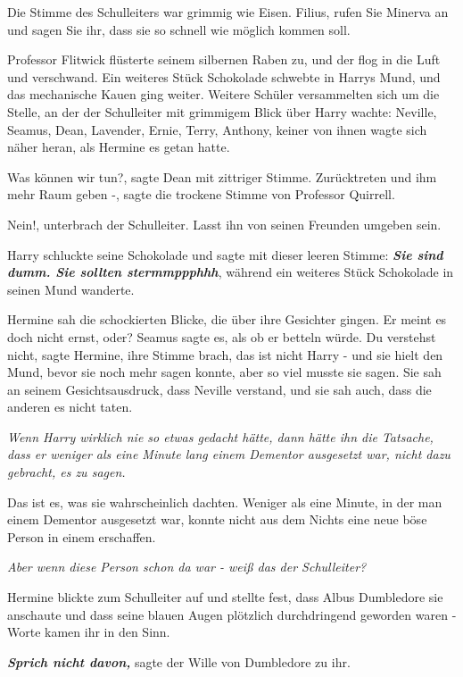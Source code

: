 Die Stimme des Schulleiters war grimmig wie Eisen. \glqq{}Filius, rufen Sie
Minerva an und sagen Sie ihr, dass sie so schnell wie möglich kommen soll.\grqq{}

Professor Flitwick flüsterte seinem silbernen Raben zu, und der flog in die Luft
und verschwand. Ein weiteres Stück Schokolade schwebte in Harrys Mund, und das
mechanische Kauen ging weiter. Weitere Schüler versammelten sich um die Stelle,
an der der Schulleiter mit grimmigem Blick über Harry wachte: Neville, Seamus,
Dean, Lavender, Ernie, Terry, Anthony, keiner von ihnen wagte sich näher heran,
als Hermine es getan hatte.

\glqq{}Was können wir tun?\grqq{}, sagte Dean mit zittriger Stimme. \glqq{}
Zurücktreten und ihm mehr Raum geben -\grqq{}, sagte die trockene Stimme von
Professor Quirrell.

\glqq{}Nein!\grqq{}, unterbrach der Schulleiter. \glqq{}Lasst ihn von seinen
Freunden umgeben sein.\grqq{}

Harry schluckte seine Schokolade und sagte mit dieser leeren Stimme: \glqq{}
\textbf{\emph{Sie sind dumm. Sie sollten stermmppphhh}}\grqq{}, während ein
weiteres Stück Schokolade in seinen Mund wanderte.

Hermine sah die schockierten Blicke, die über ihre Gesichter gingen. \glqq{}Er
meint es doch nicht ernst, oder?\grqq{} Seamus sagte es, als ob er betteln
würde. \glqq{}Du verstehst nicht\grqq{}, sagte Hermine, ihre Stimme brach, \glqq{}
das ist nicht Harry -\grqq{} und sie hielt den Mund, bevor sie noch mehr sagen konnte,
aber so viel musste sie sagen. Sie sah an seinem Gesichtsausdruck, dass Neville
verstand, und sie sah auch, dass die anderen es nicht taten.

\emph{Wenn Harry wirklich nie so etwas gedacht hätte, dann hätte ihn die
Tatsache, dass er weniger als eine Minute lang einem Dementor ausgesetzt war,
nicht dazu gebracht, es zu sagen.}

Das ist es, was sie wahrscheinlich dachten. Weniger als eine Minute, in der man
einem Dementor ausgesetzt war, konnte nicht aus dem Nichts eine neue böse Person
in einem erschaffen.

\emph{Aber wenn diese Person schon da war - weiß das der Schulleiter?}

Hermine blickte zum Schulleiter auf und stellte fest, dass Albus Dumbledore sie
anschaute und dass seine blauen Augen plötzlich durchdringend geworden waren -
Worte kamen ihr in den Sinn.

\textbf{\emph{Sprich nicht davon,} }sagte der Wille von Dumbledore zu ihr.

